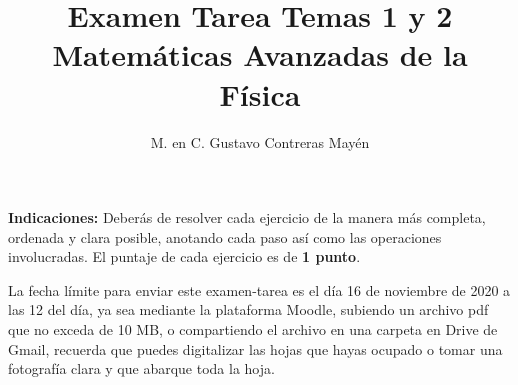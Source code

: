 
\geometry{top=1.25cm, bottom=1.5cm, left=1.25cm, right=0.8cm}
\title{Examen Tarea Temas 1 y 2 \\ \large {Matemáticas Avanzadas de la Física}  \vspace{-3ex}}
\author{M. en C. Gustavo Contreras Mayén}
\date{ }

\vspace{-4cm}
\maketitle
\fontsize{14}{14}\selectfont
\textbf{Indicaciones: } Deberás de resolver cada ejercicio de la manera más completa, ordenada y clara posible, anotando cada paso así como las operaciones involucradas. El puntaje de cada ejercicio es de \textbf{1 punto}.
\par
La fecha límite para enviar este examen-tarea es el día 16 de noviembre de 2020 a las 12 del día, ya sea mediante la plataforma Moodle, subiendo un archivo pdf que no exceda de 10 MB, o compartiendo el archivo en una carpeta en Drive de Gmail, recuerda que puedes digitalizar las hojas que hayas ocupado o tomar una fotografía clara y que abarque toda la hoja.

